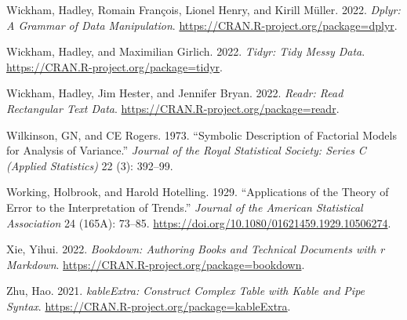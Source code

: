 \documentclass[
]{book}
\newlength{\cslhangindent}
\newlength{\cslentryspacingunit} %
\newenvironment{CSLReferences}[2] %
 {%
  \setlength{\parindent}{0pt}
  \ifodd #1
  \let\oldpar\par
  \def\par{\hangindent=\cslhangindent\oldpar}
  \fi
  \setlength{\parskip}{#2\cslentryspacingunit}
 }%
 {}
\theoremstyle{definition}
\theoremstyle{definition}
\theoremstyle{definition}
\theoremstyle{definition}
\theoremstyle{remark}
\begin{document}
\begin{CSLReferences}{1}{0}
\leavevmode{}%
Wickham, Hadley, Romain François, Lionel Henry, and Kirill Müller. 2022. \emph{Dplyr: A Grammar of Data Manipulation}. \url{https://CRAN.R-project.org/package=dplyr}.

\leavevmode{}%
Wickham, Hadley, and Maximilian Girlich. 2022. \emph{Tidyr: Tidy Messy Data}. \url{https://CRAN.R-project.org/package=tidyr}.

\leavevmode{}%
Wickham, Hadley, Jim Hester, and Jennifer Bryan. 2022. \emph{Readr: Read Rectangular Text Data}. \url{https://CRAN.R-project.org/package=readr}.

\leavevmode{}%
Wilkinson, GN, and CE Rogers. 1973. {``Symbolic Description of Factorial Models for Analysis of Variance.''} \emph{Journal of the Royal Statistical Society: Series C (Applied Statistics)} 22 (3): 392--99.

\leavevmode{}%
Working, Holbrook, and Harold Hotelling. 1929. {``Applications of the Theory of Error to the Interpretation of Trends.''} \emph{Journal of the American Statistical Association} 24 (165A): 73--85. \url{https://doi.org/10.1080/01621459.1929.10506274}.

\leavevmode{}%
Xie, Yihui. 2022. \emph{Bookdown: Authoring Books and Technical Documents with r Markdown}. \url{https://CRAN.R-project.org/package=bookdown}.

\leavevmode{}%
Zhu, Hao. 2021. \emph{kableExtra: Construct Complex Table with Kable and Pipe Syntax}. \url{https://CRAN.R-project.org/package=kableExtra}.

\end{CSLReferences}
\end{document}
